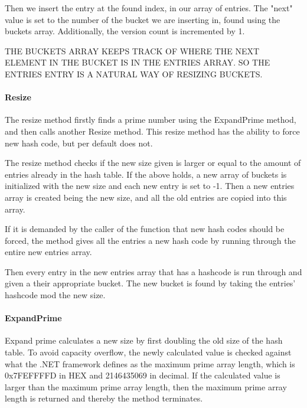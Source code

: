\documentclass[titlepage]{article}
\begin{document}
	Then we insert the entry at the found index, in our array of entries. The "next" value is set to the number of the bucket we are inserting in, found using the buckets array. 
	Additionally, the version count is incremented by 1.
	
	
	
	
	THE BUCKETS ARRAY KEEPS TRACK OF WHERE THE NEXT ELEMENT IN THE BUCKET IS IN THE ENTRIES ARRAY. SO THE ENTRIES ENTRY IS A NATURAL WAY OF RESIZING BUCKETS. 
	
	\paragraph{Resize}
	The resize method firstly finds a prime number using the ExpandPrime method, and then calls another Resize method. 
	This resize method has the ability to force new hash code, but per default does not. 
	
	The resize method checks if the new size given is larger or equal to the amount of entries already in the hash table. 
	If the above holds, a new array of buckets is initialized with the new size and each new entry is set to -1.
	Then a new entries array is created being the new size, and all the old entries are copied into this array. 
	
	If it is demanded by the caller of the function that new hash codes should be forced, the method gives all the entries a new hash code by running through the entire new entries array. 
	
	Then every entry in the new entries array that has a hashcode is run through and given a their appropriate bucket. The new bucket is found by taking the entries' hashcode mod the new size.  
	
	
	\paragraph{ExpandPrime}
	Expand prime calculates a new size by first doubling the old size of the hash table. To avoid capacity overflow, the newly calculated value is checked against what the .NET framework defines as the maximum prime array length, which is 0x7FEFFFFD in HEX and 2146435069 in decimal. If the calculated value is larger than the maximum prime array length, then the maximum prime array length is returned and thereby the method terminates. 
	
\end{document}
